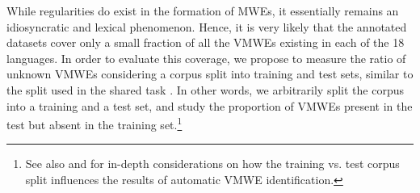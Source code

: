 \documentclass[output=paper,modfonts]{langscibook}
\begin{document}

While regularities do exist in the formation of MWEs, it essentially remains an idiosyncratic and lexical phenomenon. Hence, it is very likely that the annotated datasets cover only a small fraction of all the VMWEs %
existing in each of the 18 languages. 
In order to evaluate this coverage, we propose to measure the ratio of unknown VMWEs considering a corpus split into training and test sets, similar to the split used in the shared task \citep{MWEWorkshop}. In other words, we arbitrarily split the corpus into a training and a test set, and study 
 the proportion of VMWEs present in the test but absent in the training set.\footnote{See also  and  for in-depth considerations on how the training vs. test corpus split influences the results of automatic VMWE identification.}
\end{document}
